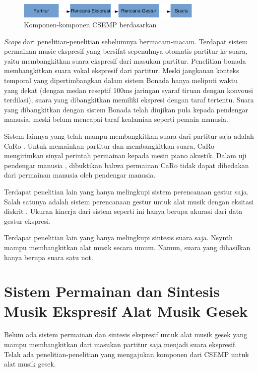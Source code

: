 \begin{figure}[h]
    \centering
    \includegraphics[width=0.8\textwidth]{resources/CSEMP-Components-Yu.eps}
    \caption{Komponen-komponen CSEMP berdasarkan \citet{yu2017bowing}}\label{yucomponents}
\end{figure}

\textit{Scope} dari penelitian-penelitian sebelumnya bermacam-macam. Terdapat sistem permainan music ekspresif yang bersifat sepenuhnya otomatis partitur-ke-suara, yaitu membangkitkan suara ekspresif dari masukan partitur. Penelitian bonada \parencite{bonada2017singing} membangkitkan suara vokal ekspresif dari partitur. Meski jangkauan konteks temporal yang dipertimbangkan dalam sistem Bonada hanya meliputi waktu yang dekat (dengan medan reseptif 100ms jaringan syaraf tiruan dengan konvousi terdilasi), suara yang dibangkitkan memiliki ekspresi dengan taraf tertentu. Suara yang dibangkitkan dengan sistem Bonada telah diujikan pula kepada pendengar manusia, meski belum mencapai taraf kealamian seperti pemain manusia.

Sistem lainnya yang telah mampu membangkitkan suara dari partitur saja adalah CaRo \parencite{canazza2015}. Untuk memainkan partitur dan membangkitkan suara, CaRo mengirimkan sinyal perintah permainan kepada mesin piano akustik. Dalam uji pendengar manusia \parencite{schubert2017test}, dibuktikan bahwa permainan CaRo tidak dapat dibedakan dari permainan manusia oleh pendengar manusia.

Terdapat penelitian lain yang hanya melingkupi sistem perencanaan gestur saja. Salah satunya adalah sistem perencanaan gestur untuk alat musik dengan eksitasi diskrit \parencite{miranda2010}. Ukuran kinerja dari sistem seperti ini hanya berupa akurasi dari data gestur ekspresi.

Terdapat penelitian lain yang hanya melingkupi sintesis suara saja. Nsynth \parencite{nsynth2017} mampu membangkitkan alat musik secara umum. Namun, suara yang dihasilkan hanya berupa suara satu not.

\section{Sistem Permainan dan Sintesis Musik Ekspresif Alat Musik Gesek}

Belum ada sistem permainan dan sintesis ekspresif untuk alat musik gesek yang mampu membangkitkan dari masukan partitur saja menjadi suara ekspresif. Telah ada penelitian-penelitian yang mengajukan komponen dari CSEMP untuk alat musik gesek.

